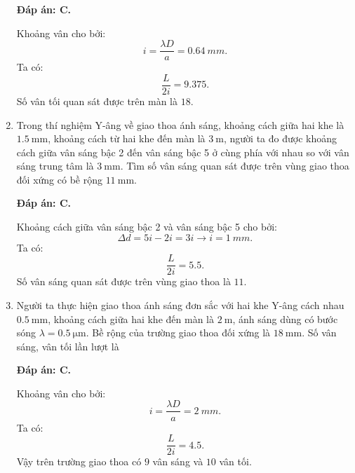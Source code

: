 \begin{enumerate}[label=\bfseries Câu \arabic*:]
	\loigiai
	{		\textbf{Đáp án: C.}
		
Khoảng vân cho bởi:
$$
	i = \dfrac{\lambda D}{a} = \SI{0,64}{mm}.
$$
Ta có:
$$
	\dfrac{L}{2i} = \num{9,375}.
$$
Số vân tối quan sát được trên màn là $ \num{18} $.
	}
	
\item {} 
		\cauhoi
	{Trong thí nghiệm Y-âng về giao thoa ánh sáng, khoảng cách giữa hai khe là $\SI{1.5}{\milli \meter}$, khoảng cách từ hai khe đến màn là $\SI{3}{\meter}$, người ta đo được khoảng cách giữa vân sáng bậc 2 đến vân sáng bậc 5 ở cùng phía với nhau so với vân sáng trung tâm là $\SI{3}{\milli \meter}$. Tìm số vân sáng quan sát được trên vùng giao thoa đối xứng có bề rộng $\SI{11}{\milli \meter}$.
	}
	
	\loigiai
	{		\textbf{Đáp án: C.}
		
Khoảng cách giữa vân sáng bậc 2 và vân sáng bậc 5 cho bởi:
$$
	\Delta d = 5i - 2i = 3i \rightarrow i = \SI{1}{mm}.
$$
Ta có:
$$
	\dfrac{L}{2i} = \num{5,5}.
$$
Số vân sáng quan sát được trên vùng giao thoa là $ \num{11} $.
		
	}
	
	\item {}
		\cauhoi
	{Người ta thực hiện giao thoa ánh sáng đơn sắc với hai khe Y-âng cách nhau $\SI{0.5}{\milli \meter}$, khoảng cách giữa hai khe đến màn là $\SI{2}{\meter}$, ánh sáng dùng có bước sóng $\lambda=\SI{0.5}{\micro \meter}$. Bề rộng của trường giao thoa đối xứng là $\SI{18}{\milli \meter}$. Số vân sáng, vân tối lần lượt là
	}
	
		
	\loigiai
	{		\textbf{Đáp án: C.}

Khoảng vân cho bởi:
$$
	i = \dfrac{\lambda D}{a} = \SI{2}{mm}.
$$
Ta có:
$$
	\dfrac{L}{2i}=\num{4,5}.
$$
Vậy trên trường giao thoa có $ 9 $ vân sáng và $ 10 $ vân tối.
		
}
\end{enumerate}
